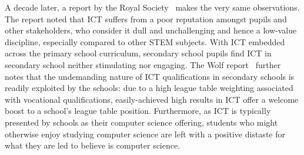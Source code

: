 \documentclass{sig-alternate}
\begin{document}
A decade later, a report by the Royal Society~\cite{RoyalSoc:2012}
makes the very same observations.  The report noted that ICT suffers
from a poor reputation amongst pupils and other stakeholders, who
consider it dull and unchallenging and hence a low-value discipline,
especially compared to other STEM subjects.  With ICT embedded across
the primary school curriculum, secondary school pupils find ICT
in secondary school neither stimulating nor engaging.  The Wolf
report~\cite{Wolf:2011} further notes that the undemanding nature of
ICT qualifications in secondary schools is readily exploited by the
schools: due to a high league table weighting associated with
vocational qualifications, easily-achieved high results in ICT offer a
welcome boost to a school's league table position.  Furthermore, as
ICT is typically presented by schools as their computer science
offering, students who might otherwise enjoy studying computer science
are left with a positive distaste for what they are led to believe is
computer science.
\end{document}
